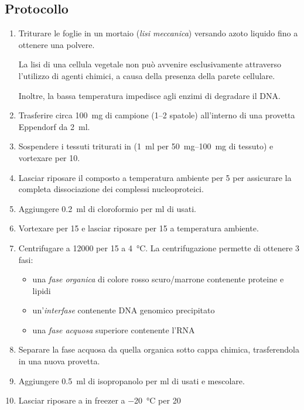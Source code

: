 \subsection{Protocollo}
\begin{enumerate}
	\item Triturare le foglie in un mortaio (\textit{lisi meccanica}) versando azoto liquido fino a ottenere una polvere.
	\begin{Note}
		La lisi di una cellula vegetale non può avvenire esclusivamente attraverso l’utilizzo di agenti chimici, a causa della presenza della parete cellulare.  
		
		Inoltre, la bassa temperatura impedisce agli enzimi di degradare il DNA.
	\end{Note}
	\item Trasferire circa \qty{100}{\mg} di campione (\numrange{1}{2} spatole) all’interno di una provetta \foreignlanguage{german}{Eppendorf} da \qty{2}{\ml}.
	\item Sospendere i tessuti triturati in \trizol (\qty{1}{ml} per \qtyrange{50}{100}{\mg} di tessuto) e vortexare per \qty{10}{\sec}.
	\item Lasciar riposare il composto a temperatura ambiente per \qty{5}{\min} per assicurare la completa dissociazione dei complessi nucleoproteici.
	\item Aggiungere \qty{0.2}{\ml} di cloroformio per ml di \trizol usati.
	\item Vortexare per \qty{15}{\sec} e lasciar riposare per \qty{15}{\min} a temperatura ambiente.
	\item Centrifugare a \qty{12000}{\giri} per \qty{15}{\min} a \qty{4}{\celsius}. La centrifugazione permette di ottenere 3 fasi: 
	\begin{itemize}
		\item una \emph{fase organica} di colore rosso scuro/marrone contenente proteine e lipidi
		\item un’\emph{interfase} contenente DNA genomico precipitato
		\item una \emph{fase acquosa} superiore contenente l’RNA
	\end{itemize}
	\item Separare la fase acquosa da quella organica sotto cappa chimica, trasferendola in una nuova provetta.
	\item Aggiungere \qty{0.5}{ml} di isopropanolo per \unit{\ml} di \trizol usati e mescolare.
	\item Lasciar riposare a in freezer a \qty{-20}{\celsius} per \qty{20}{\min}

\end{enumerate}
